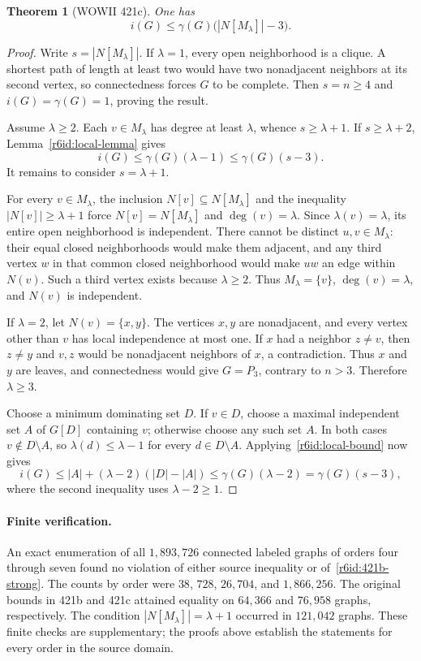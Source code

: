 \documentclass[11pt,a4paper]{article}
\newtheorem{theorem}{Theorem}[section]
\theoremstyle{remark}
\begin{document}
\begin{theorem}[WOWII 421c]\label{r6id:421c}
One has
\[
 i(G)\leq\gamma(G)\bigl(|N[M_\lambda]|-3\bigr).
\]
\end{theorem}
\begin{proof}
Write $s=|N[M_\lambda]|$.  If $\lambda=1$, every open neighborhood is a
clique.  A shortest path of length at least two would have two nonadjacent
neighbors at its second vertex, so connectedness forces $G$ to be
complete.  Then $s=n\geq4$ and $i(G)=\gamma(G)=1$, proving the result.

Assume $\lambda\geq2$.  Each $v\in M_\lambda$ has degree at least
$\lambda$, whence $s\geq\lambda+1$.  If $s\geq\lambda+2$,
Lemma~\ref{r6id:local-lemma} gives
\[
 i(G)\leq\gamma(G)(\lambda-1)\leq\gamma(G)(s-3).
\]
It remains to consider $s=\lambda+1$.

For every $v\in M_\lambda$, the inclusion $N[v]\subseteq N[M_\lambda]$
and the inequality $|N[v]|\geq\lambda+1$ force
$N[v]=N[M_\lambda]$ and $\deg(v)=\lambda$.  Since
$\lambda(v)=\lambda$, its entire open neighborhood is independent.
There cannot be distinct $u,v\in M_\lambda$: their equal closed
neighborhoods would make them adjacent, and any third vertex $w$ in that
common closed neighborhood would make $uw$ an edge within $N(v)$.
Such a third vertex exists because $\lambda\geq2$.
Thus $M_\lambda=\{v\}$, $\deg(v)=\lambda$, and $N(v)$ is independent.

If $\lambda=2$, let $N(v)=\{x,y\}$.  The vertices $x,y$ are nonadjacent,
and every vertex other than $v$ has local independence at most one.
If $x$ had a neighbor $z\ne v$, then $z\ne y$ and $v,z$ would be
nonadjacent neighbors of $x$, a contradiction.  Thus $x$ and $y$ are
leaves, and connectedness would give $G=P_3$, contrary to $n>3$.
Therefore $\lambda\geq3$.

Choose a minimum dominating set $D$.  If $v\in D$, choose a maximal
independent set $A$ of $G[D]$ containing $v$; otherwise choose any such
set $A$.  In both cases $v\notin D\setminus A$, so
$\lambda(d)\leq\lambda-1$ for every $d\in D\setminus A$.
Applying~\eqref{r6id:local-bound} now gives
\[
 i(G)\leq |A|+(\lambda-2)(|D|-|A|)
       \leq\gamma(G)(\lambda-2)
       =\gamma(G)(s-3),
\]
where the second inequality uses $\lambda-2\geq1$.
\end{proof}

\paragraph{Finite verification.}
An exact enumeration of all $1{,}893{,}726$ connected labeled graphs of
orders four through seven found no violation of either source inequality
or of~\eqref{r6id:421b-strong}.  The counts by order were
$38$, $728$, $26{,}704$, and $1{,}866{,}256$.
The original bounds in 421b and 421c attained equality on $64{,}366$ and
$76{,}958$ graphs, respectively.  The condition
$|N[M_\lambda]|=\lambda+1$ occurred in $121{,}042$ graphs.
These finite checks are supplementary; the proofs above establish the
statements for every order in the source domain.
\end{document}
